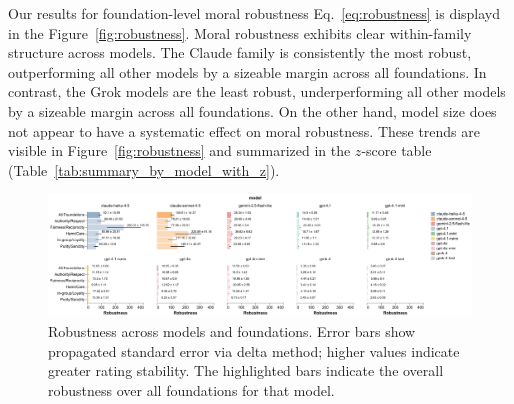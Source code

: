 \documentclass{article}
\begin{document}
Our results for foundation-level moral robustness Eq.~\eqref{eq:robustness} is displayd in the Figure~\ref{fig:robustness}. Moral robustness exhibits clear within-family structure across models. The Claude family is consistently the most robust, outperforming all other models by a sizeable margin across all foundations. In contrast, the Grok models are the least robust, underperforming all other models by a sizeable margin across all foundations. On the other hand, model size does not appear to have a systematic effect on moral robustness. These trends are visible in Figure~\ref{fig:robustness} and summarized in the $z$-score table (Table~\ref{tab:summary_by_model_with_z}).


\begin{figure}[!t]
  \centering
  \includegraphics[width=0.9\linewidth]{../results/robustness_bars.pdf}\hfill
  \caption{Robustness across models and foundations. Error bars show propagated standard error via delta method; higher values indicate greater rating stability. The highlighted bars indicate the overall robustness over all foundations for that model.}
  \label{fig:robustness2}
\end{figure}
\end{document}
